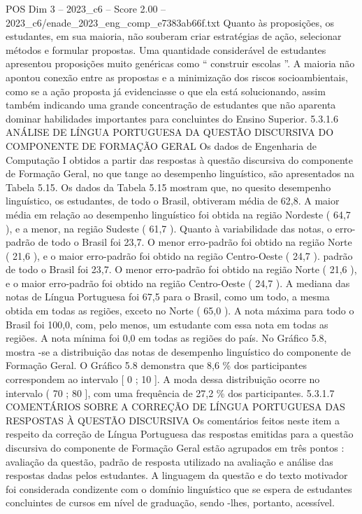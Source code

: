 \begin{textsample}{POS Dim 3 – 2023\_c6 – Score 2.00 – 2023\_c6/enade\_2023\_eng\_comp\_e7383ab66f.txt}
Quanto às proposições, os estudantes, em sua maioria, não souberam criar estratégias de ação, selecionar métodos e formular propostas.
Uma quantidade considerável de estudantes apresentou proposições muito genéricas como “ construir escolas ”.
A maioria não apontou conexão entre as propostas e a minimização dos riscos socioambientais, como se a ação proposta já evidenciasse o que ela está solucionando, assim também indicando uma grande concentração de estudantes que não aparenta dominar habilidades importantes para concluintes do Ensino Superior. 5.3.1.6 ANÁLISE DE LÍNGUA PORTUGUESA DA QUESTÃO DISCURSIVA DO COMPONENTE DE FORMAÇÃO GERAL Os dados de Engenharia de Computação I obtidos a partir das respostas à questão discursiva do componente de Formação Geral, no que tange ao desempenho linguístico, são apresentados na Tabela 5.15.
Os dados da Tabela 5.15 mostram que, no quesito desempenho linguístico, os estudantes, de todo o Brasil, obtiveram média de 62,8.
A maior média em relação ao desempenho linguístico foi obtida na região Nordeste ( 64,7 ), e a menor, na região Sudeste ( 61,7 ).
Quanto à variabilidade das notas, o erro-padrão de todo o Brasil foi 23,7.
O menor erro-padrão foi obtido na região Norte ( 21,6 ), e o maior erro-padrão foi obtido na região Centro-Oeste ( 24,7 ). padrão de todo o Brasil foi 23,7.
O menor erro-padrão foi obtido na região Norte ( 21,6 ), e o maior erro-padrão foi obtido na região Centro-Oeste ( 24,7 ).
A mediana das notas de Língua Portuguesa foi 67,5 para o Brasil, como um todo, a mesma obtida em todas as regiões, exceto no Norte ( 65,0 ).
A nota máxima para todo o Brasil foi 100,0, com, pelo menos, um estudante com essa nota em todas as regiões.
A nota mínima foi 0,0 em todas as regiões do país.
No Gráfico 5.8, mostra -se a distribuição das notas de desempenho linguístico do componente de Formação Geral.
O Gráfico 5.8 demonstra que 8,6 \% dos participantes correspondem ao intervalo [ 0 ; 10 ].
A moda dessa distribuição ocorre no intervalo ( 70 ; 80 ], com uma frequência de 27,2 \% dos participantes. 5.3.1.7 COMENTÁRIOS SOBRE A CORREÇÃO DE LÍNGUA PORTUGUESA DAS RESPOSTAS À QUESTÃO DISCURSIVA Os comentários feitos neste item a respeito da correção de Língua Portuguesa das respostas emitidas para a questão discursiva do componente de Formação Geral estão agrupados em três pontos : avaliação da questão, padrão de resposta utilizado na avaliação e análise das respostas dadas pelos estudantes.
A linguagem da questão e do texto motivador foi considerada condizente com o domínio linguístico que se espera de estudantes concluintes de cursos em nível de graduação, sendo -lhes, portanto, acessível.

\end{textsample}
